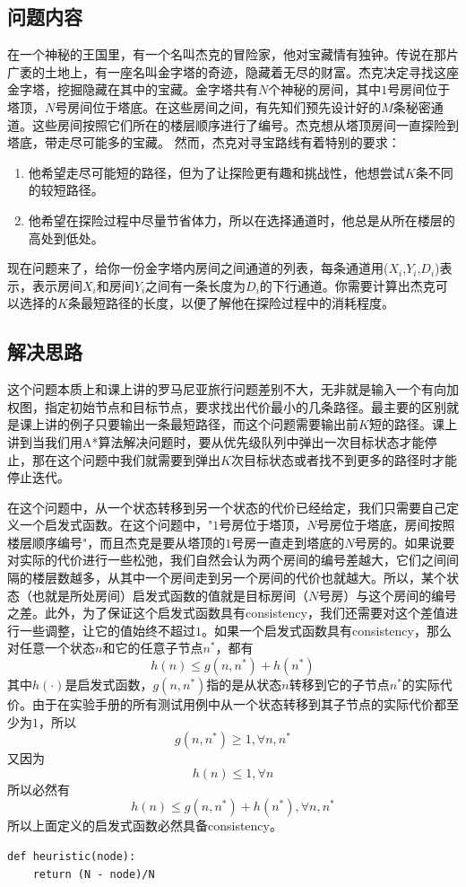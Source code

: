 \documentclass{article}
\begin{document}
\subsection{问题内容}
在⼀个神秘的王国⾥，有⼀个名叫杰克的冒险家，他对宝藏情有独钟。传说在那⽚⼴袤的⼟地上，有⼀座名叫⾦字塔的奇迹，隐藏着⽆尽的财富。杰克决定寻找这座⾦字塔，挖掘隐藏在其中的宝藏。⾦字塔共有$N$个神秘的房间，其中$1$号房间位于塔顶，$N$号房间位于塔底。在这些房间之间，有先知们预先设计好的$M$条秘密通道。这些房间按照它们所在的楼层顺序进⾏了编号。杰克想从塔顶房间⼀直探险到塔底，带⾛尽可能多的宝藏。
然⽽，杰克对寻宝路线有着特别的要求：
\begin{enumerate}
\item 他希望⾛尽可能短的路径，但为了让探险更有趣和挑战性，他想尝试$K$条不同的较短路径。
\item 他希望在探险过程中尽量节省体⼒，所以在选择通道时，他总是从所在楼层的⾼处到低处。
\end{enumerate}

现在问题来了，给你⼀份⾦字塔内房间之间通道的列表，每条通道⽤($X_i$,$Y_i$,$D_i$)表⽰，表⽰房间$X_i$和房间$Y_i$之间有⼀条长度为$D_i$的下⾏通道。你需要计算出杰克可以选择的$K$条最短路径的长度，以便了解他在探险过程中的消耗程度。

\subsection{解决思路}
这个问题本质上和课上讲的罗马尼亚旅行问题差别不大，无非就是输入一个有向加权图，指定初始节点和目标节点，要求找出代价最小的几条路径。最主要的区别就是课上讲的例子只要输出一条最短路径，而这个问题需要输出前$K$短的路径。课上讲到当我们用A*算法解决问题时，要从优先级队列中弹出一次目标状态才能停止，那在这个问题中我们就需要到弹出$K$次目标状态或者找不到更多的路径时才能停止迭代。

在这个问题中，从一个状态转移到另一个状态的代价已经给定，我们只需要自己定义一个启发式函数。在这个问题中，"$1$号房位于塔顶，$N$号房位于塔底，房间按照楼层顺序编号"，而且杰克是要从塔顶的$1$号房一直走到塔底的$N$号房的。如果说要对实际的代价进行一些松弛，我们自然会认为两个房间的编号差越大，它们之间间隔的楼层数越多，从其中一个房间走到另一个房间的代价也就越大。所以，某个状态（也就是所处房间）启发式函数的值就是目标房间（$N$号房）与这个房间的编号之差。此外，为了保证这个启发式函数具有consistency，我们还需要对这个差值进行一些调整，让它的值始终不超过$1$。如果一个启发式函数具有consistency，那么对任意一个状态$n$和它的任意子节点$n^*$，都有
$$h(n)\leq g(n,n^*)+h(n^*)$$
其中$h(·)$是启发式函数，$g(n,n^*)$指的是从状态$n$转移到它的子节点$n^*$的实际代价。由于在实验手册的所有测试用例中从一个状态转移到其子节点的实际代价都至少为$1$，所以$$g(n,n^*)\geq 1, {\forall}n,n^*$$
又因为
$$h(n)\leq 1, {\forall}n$$
所以必然有
$$h(n)\leq g(n,n^*)+h(n^*), {\forall}n,n^*$$
所以上面定义的启发式函数必然具备consistency。
\begin{lstlisting}
def heuristic(node):
    return (N - node)/N
\end{lstlisting}
\end{document}
